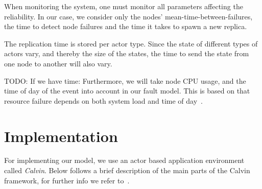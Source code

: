 \documentclass{cslthse-msc}
\begin{document}
When monitoring the system, one must monitor all parameters affecting the reliability. In our case, we consider only the nodes' mean-time-between-failures, the time to detect node failures and the time it takes to spawn a new replica.

The replication time is stored per actor type. Since the state of different types of actors vary, and thereby the size of the states, the time to send the state from one node to another will also vary. 

TODO: If we have time:
Furthermore, we will take node CPU usage, and the time of day of the event into account in our fault model. This is based on that resource failure depends on both system load and time of day~\cite{implicationsOfFailures, studyOfFailures}.

\section{Implementation} \label{sec:design_implementation}
For implementing our model, we use an actor based application environment called \emph{Calvin}. Below follows a brief description of the main parts of the Calvin framework, for further info we refer to~\cite{calvin}.
\end{document}
